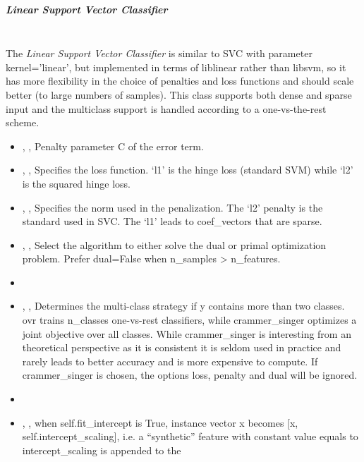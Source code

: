\subparagraph{Linear Support Vector Classifier}
\mbox{}
\\The \textit{Linear Support Vector Classifier} is similar to SVC with parameter
kernel=’linear’, but implemented in terms of liblinear rather than libsvm,
so it has more flexibility in the choice of penalties and loss functions and
should scale better (to large numbers of samples).
%
This class supports both dense and sparse input and the multiclass support is
handled according to a one-vs-the-rest scheme.
%
\begin{itemize}
  \item {} , ,
  Penalty parameter C of the error term.
  \item {} , ,
  Specifies the loss function.
  ‘l1’ is the hinge loss (standard SVM) while ‘l2’ is the squared hinge
  loss.
  \item {} , ,
  Specifies the norm used in the penalization.
  The ‘l2’ penalty is the standard used in SVC.
  The ‘l1’ leads to coef\_vectors that are sparse.
  \item {} , ,
  Select the algorithm to either solve the dual or primal optimization problem.
  Prefer dual=False when n\_samples > n\_features.
  \item \tolDescriptionC{}
  \item {} , ,
  Determines the multi-class strategy if y contains more than two classes.
  ovr trains n\_classes one-vs-rest classifiers, while
  crammer\_singer optimizes a joint objective over all classes.
  While crammer\_singer is interesting from an theoretical
  perspective as it is consistent it is seldom used in practice and rarely leads
  to better accuracy and is more expensive to compute.
  If crammer\_singer is chosen, the options loss, penalty and dual
  will be ignored.
  \item {}
  \item {} , ,
  when self.fit\_intercept is True, instance vector x becomes [x,
  self.intercept\_scaling], i.e. a “synthetic” feature with
  constant value equals to intercept\_scaling is appended to the

\end{itemize}
